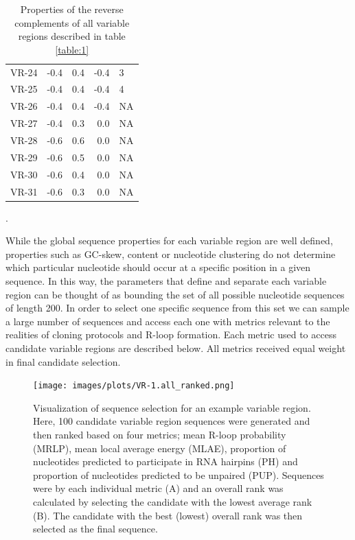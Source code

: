 \documentclass[11pt]{article}
\begin{document}
\begin{table}
\begin{tabular}{lrrrl}
	VR-24 &     -0.4 &         0.4 &     -0.4 &              3 \\
	VR-25 &     -0.4 &         0.4 &     -0.4 &              4 \\
	VR-26 &     -0.4 &         0.4 &     -0.4 &             NA \\
	VR-27 &     -0.4 &         0.3 &      0.0 &             NA \\
	VR-28 &     -0.6 &         0.6 &      0.0 &             NA \\
	VR-29 &     -0.6 &         0.5 &      0.0 &             NA \\
	VR-30 &     -0.6 &         0.4 &      0.0 &             NA \\
	VR-31 &     -0.6 &         0.3 &      0.0 &             NA \\
	\bottomrule
	
\end{tabular}
\caption{Properties of the reverse complements of all variable regions described in table \ref{table:1}}.
\label{table:2}
\end{table}

While the global sequence properties for each variable region are well defined, properties such as GC-skew, content or nucleotide clustering do not determine which particular nucleotide should occur at a specific position in a given sequence. In this way, the parameters that define and separate each variable region can be thought of as bounding the set of all possible nucleotide sequences of length 200. In order to select one specific sequence from this set we can sample a large number of sequences and access each one with metrics relevant to the realities of cloning protocols and R-loop formation. Each metric used to access candidate variable regions are described below. All metrics received equal weight in final candidate selection. 

\begin{figure}[H]
	\texttt{[image: images/plots/VR-1.all\_ranked.png]}
	\centering
	\caption{Visualization of sequence selection for an example variable region. Here, 100 candidate variable region sequences were generated and then ranked based on four metrics; mean R-loop probability (MRLP), mean local average energy (MLAE), proportion of nucleotides predicted to participate in RNA hairpins (PH) and proportion of nucleotides predicted to be unpaired (PUP). Sequences were by each individual metric (A) and an overall rank was calculated by selecting the candidate with the lowest average rank (B). The candidate with the best (lowest) overall rank was then selected as the final sequence.}
	\label{ranking}
\end{figure}
\end{document}
